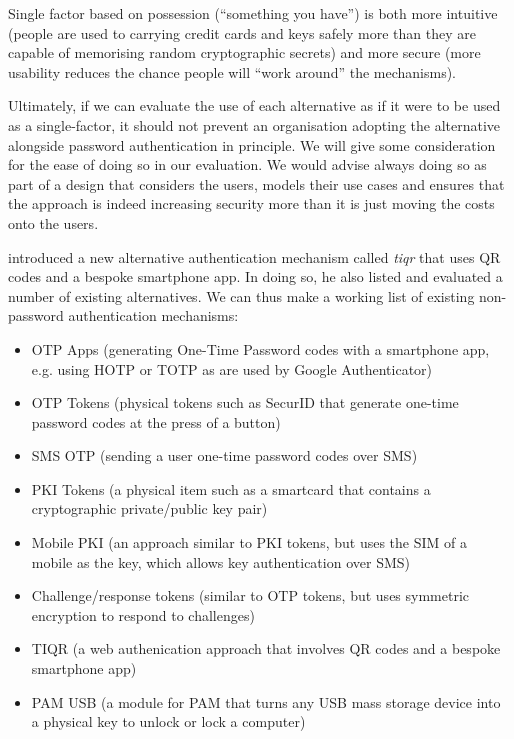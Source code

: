 \documentclass{report}
\begin{document}
Single factor based on possession (``something
you have'') is both more intuitive (people are used to carrying credit cards
and keys safely more than they are capable of memorising random
cryptographic secrets) and more secure (more usability reduces the chance
people will ``work around'' the mechanisms).

Ultimately, if we can evaluate the use of each alternative as if it were
to be used as a single-factor, it should not prevent an organisation
adopting the alternative alongside password authentication in principle. We
will give some consideration for the ease of doing so in our evaluation. We
would advise always doing so as part of a design that considers the users,
models their use cases and ensures that the approach is indeed increasing
security more than it is just moving the costs onto the users.

\cite{van2011tiqr} introduced a new alternative authentication mechanism
called \emph{tiqr} that uses QR codes and a bespoke smartphone app. In
doing so, he also listed and evaluated a number of existing alternatives. We
can thus make a working list of existing non-password authentication
mechanisms:

\begin{itemize}
  \item OTP Apps (generating One-Time Password codes with a smartphone app, e.g.
    using HOTP or TOTP as are used by Google Authenticator)
  \item OTP Tokens (physical tokens such as SecurID that generate one-time
    password codes at the press of a button)
  \item SMS OTP (sending a user one-time password codes over SMS)
  \item PKI Tokens (a physical item such as a smartcard that contains
    a cryptographic private/public key pair)
  \item Mobile PKI (an approach similar to PKI tokens, but uses the SIM of a
    mobile as the key, which allows key authentication over SMS)
  \item Challenge/response tokens (similar to OTP tokens, but uses symmetric
    encryption to respond to challenges)
  \item TIQR (a web authenication approach that involves QR codes and a
    bespoke smartphone app)
  \item PAM USB (a module for PAM that turns any USB mass storage device
    into a physical key to unlock or lock a computer)
\end{itemize}
\end{document}
